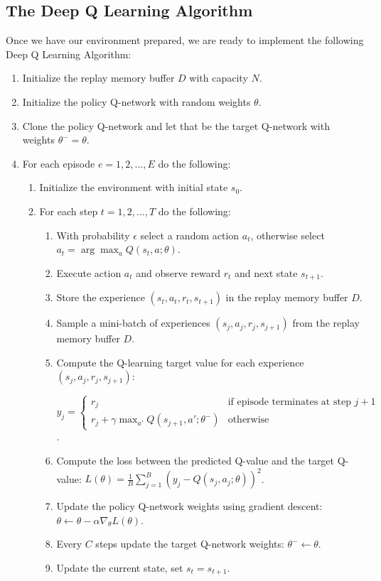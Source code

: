 \documentclass[12pt,oneside]{article}
\begin{document}
\subsection{The Deep Q Learning Algorithm}
Once we have our environment prepared, we are ready to implement the following Deep Q Learning Algorithm:
\begin{enumerate}
\item  \label{itm:dqn_1} Initialize the replay memory buffer $D$ with capacity $N$.
\item Initialize the policy Q-network with random weights $\theta$.
\item Clone the policy Q-network and let that be the target Q-network with weights $\theta^{-} = \theta$.
\item For each episode $e=1,2,...,E$ do the following:
	\begin{enumerate}
	\item Initialize the environment with initial state $s_0$.
	\item For each step $t=1,2,...,T$ do the following:
		\begin{enumerate}
		\item With probability $\epsilon$ select a random action $a_t$, otherwise select $a_t=\arg\max_{a} Q(s_t, a; \theta)$.
		\item Execute action $a_t$ and observe reward $r_t$ and next state $s_{t+1}$.
		\item Store the experience $(s_t, a_t, r_t, s_{t+1})$ in the replay memory buffer $D$.
		\item Sample a mini-batch of experiences $(s_j, a_j, r_j, s_{j+1})$ from the replay memory buffer $D$.
		
		\item Compute the Q-learning target value for each experience $(s_j, a_j, r_j, s_{j+1})$:
		
		 $y_j = 
		 \begin{cases} 
		 r_j & \text{if episode terminates at step } j+1 \\ 
		 r_j + \gamma\max_{a'}Q(s_{j+1},a';\theta^{-}) & \text{otherwise} \end{cases}$.
		
		\item Compute the loss between the predicted Q-value and the target Q-value: $L(\theta) = \frac{1}{B}\sum_{j=1}^B(y_j-Q(s_j,a_j;\theta))^2$.
		\item Update the policy Q-network weights using gradient descent: $\theta \leftarrow \theta - \alpha\nabla_\theta L(\theta)$.
		\item Every $C$ steps update the target Q-network weights: $\theta^{-} \leftarrow \theta$.
		\item Update the current state, set $s_t=s_{t+1}$.
		\end{enumerate}
	\end{enumerate}
\end{enumerate}
\end{document}
